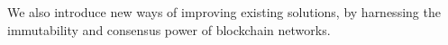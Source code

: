 We also introduce new ways of improving existing solutions, by harnessing the immutability and consensus power of blockchain networks.







